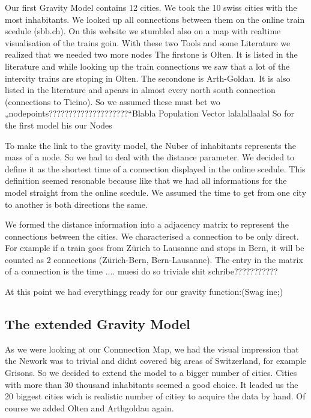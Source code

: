 \documentclass[11pt]{article}
\begin{document}
Our first Gravity Model contains 12 cities. We took the 10 swiss cities with the most inhabitants. We looked up all connections between them on the online train scedule (sbb.ch). On this website we stumbled also on a map with realtime visualisation of the trains goin. With these two Tools and some Literature we realized that we needed two more nodes %
The firstone is Olten. It is listed in the literature and while looking up the train connections we saw that a lot of the intercity trains are stoping in Olten. 
The secondone is Arth-Goldau. It is also listed in the literature and apears in almost every north south connection (connections to Ticino).
So we assumed these must bet wo „nodepoints????????????????????“Blabla Population Vector lalalallaalal
So for the first model his our Nodes

To make the link to the gravity model, the Nuber of inhabitants represents the mass of a node. So we had to deal with the distance parameter. We decided to define it as the shortest time of a connection displayed in the online scedule. This definition seemed resonable because like that we had all informations for the model straight from the online scedule. We assumed the time to get from one city to another is both directions the same.

We formed the distance information into a adjacency matrix to represent the connections between the cities.  We characterised a connection to be only direct. For example if a train goes from Zürich to Lausanne and stops in Bern, it will be counted as 2 connections (Zürich-Bern, Bern-Lausanne). The entry in the matrix of a connection is the time .... muesi do so triviale shit schribe???????????

At this point we had everythingg ready for our gravity function:(Swag ine;)



\subsection{The extended Gravity Model}


As we were looking at our Connnection Map, we had the visual impression that the Nework was to trivial and didnt covered big areas of Switzerland, for example Grisons. So we decided to extend the model to a bigger number of cities. Cities with more than 30 thousand inhabitants seemed a good choice. It leaded us the 20 biggest cities wich is realistic number of citiey to acquire the data by hand.  Of course we added Olten and Arthgoldau again.
\end{document}
